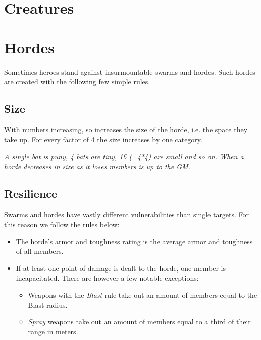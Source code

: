 \documentclass[12pt,a4paper,openany]{book}
\begin{document}
	\vspace{5mm}
	

	\pagebreak

	\section{Creatures}
	

	\pagebreak
	\section{Hordes}
	Sometimes heroes stand against insurmountable swarms and hordes. Such hordes are created with the following few simple rules.
	
	\subsection*{Size}
	With numbers increasing, so increases the size of the horde, i.e. the space they take up. For every factor of 4 the size increases by one category.
	\begin{exampleblock}
		\itshape A single bat is puny, 4 bats are tiny, 16 (=4*4) are small and so on. When a horde decreases in size as it loses members is up to the GM.
	\end{exampleblock}
	
	\subsection*{Resilience}
	Swarms and hordes have vastly different vulnerabilities than single targets. For this reason we follow the rules below:
	\begin{itemize}
		\setlength\itemsep{-8mm} \vspace{-8mm}
		\item The horde's armor and toughness rating is the average armor and toughness of all members.
		\item If at least one point of damage is dealt to the horde, one member is incapacitated. There are however a few notable exceptions:
			\begin{itemize}
				\setlength\itemsep{-8mm} \vspace{-8mm}
				\item Weapons with the \emph{Blast} rule take out an amount of members equal to the Blast radius.
				\item \emph{Spray} weapons take out an amount of members equal to a third of their range in meters.
			\end{itemize}
	\end{itemize}
	
\end{document}

